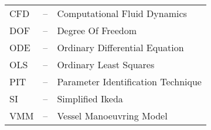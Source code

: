 
\begin{tabular}{ l c l }
CFD & -- & Computational Fluid Dynamics\\
DOF & -- & Degree Of Freedom\\
ODE & -- & Ordinary Differential Equation\\
OLS & -- & Ordinary Least Squares\\
PIT & -- & Parameter Identification Technique\\
SI  & -- & Simplified Ikeda\\
VMM & -- & Vessel Manoeuvring Model\\

\end{tabular}
